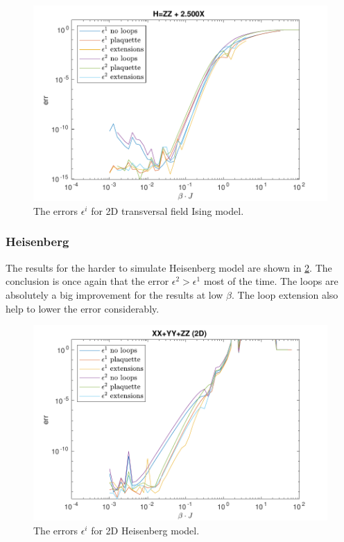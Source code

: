 \begin{figure}[h!]
    \center
    \includegraphics[width=\textwidth]{Figuren/benchmarking/2D_Err01_t_sing.pdf}
    \caption{The errors $\epsilon^i$ for 2D transversal field Ising model. }
    \label{fig:res2d:n1:tising}
\end{figure}

\subsubsection{Heisenberg}

The results for the harder to simulate Heisenberg model are shown in \cref{fig:res2d:n1:heis}. The conclusion is once again that the error $\epsilon^2 > \epsilon^1$ most of the time. The loops are absolutely a big improvement for  the results at low $\beta$. The loop extension also help to lower the error considerably.

\begin{figure}[h!]
    \center
    \includegraphics[width=\textwidth]{Figuren/benchmarking/2D_Err01_heis.pdf}
    \caption{The errors $\epsilon^i$ for 2D Heisenberg model. }
    \label{fig:res2d:n1:heis}
\end{figure}

